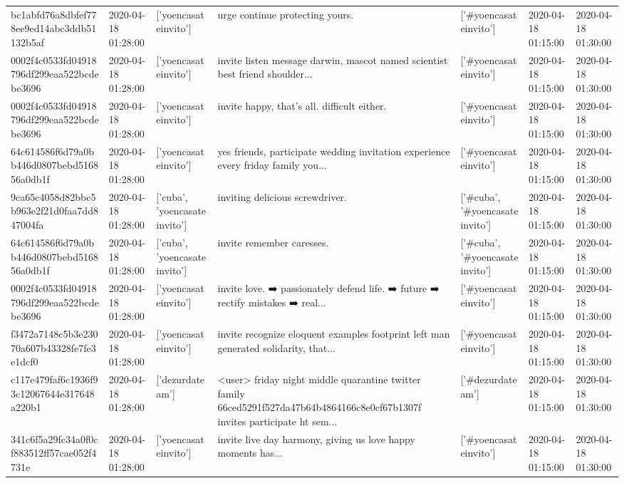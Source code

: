 \begin{tabular}{lllllll}
bc1abfd76a8dbfef778ee9ed14abc3ddb51132b5af & 2020-04-18 01:28:00 & ['yoencasateinvito'] & urge continue protecting yours. & ['#yoencasateinvito'] & 2020-04-18 01:15:00 & 2020-04-18 01:30:00 \\
0002f4c0533fd04918796df299eaa522bcdebe3696 & 2020-04-18 01:28:00 & ['yoencasateinvito'] & invite listen message darwin, mascot named scientist best friend shoulder... & ['#yoencasateinvito'] & 2020-04-18 01:15:00 & 2020-04-18 01:30:00 \\
0002f4c0533fd04918796df299eaa522bcdebe3696 & 2020-04-18 01:28:00 & ['yoencasateinvito'] & invite happy, that's all. difficult either. & ['#yoencasateinvito'] & 2020-04-18 01:15:00 & 2020-04-18 01:30:00 \\
64c614586f6d79a0bb446d0807bebd516856a0db1f & 2020-04-18 01:28:00 & ['yoencasateinvito'] & yes friends, participate wedding invitation experience every friday family you... & ['#yoencasateinvito'] & 2020-04-18 01:15:00 & 2020-04-18 01:30:00 \\
9ca65c4058d82bbc5b963e2f21d0faa7dd847004fa & 2020-04-18 01:28:00 & ['cuba', 'yoencasateinvito'] & inviting delicious screwdriver. & ['#cuba', '#yoencasateinvito'] & 2020-04-18 01:15:00 & 2020-04-18 01:30:00 \\
64c614586f6d79a0bb446d0807bebd516856a0db1f & 2020-04-18 01:28:00 & ['cuba', 'yoencasateinvito'] & invite remember caresses. & ['#cuba', '#yoencasateinvito'] & 2020-04-18 01:15:00 & 2020-04-18 01:30:00 \\
0002f4c0533fd04918796df299eaa522bcdebe3696 & 2020-04-18 01:28:00 & ['yoencasateinvito'] & invite love. ➡️ passionately defend life. ➡️ future ➡️ rectify mistakes ➡️ real... & ['#yoencasateinvito'] & 2020-04-18 01:15:00 & 2020-04-18 01:30:00 \\
f3472a7148c5b3e23070a607b43328fe7fe3e1dcf0 & 2020-04-18 01:28:00 & ['yoencasateinvito'] & invite recognize eloquent examples footprint left man generated solidarity, that... & ['#yoencasateinvito'] & 2020-04-18 01:15:00 & 2020-04-18 01:30:00 \\
c117e479faf6c1936f93c12067644e317648a220b1 & 2020-04-18 01:28:00 & ['dezurdateam'] & <user> friday night middle quarantine twitter family 66ced5291f527da47b64b4864166c8e0cf67b1307f invites participate ht sem... & ['#dezurdateam'] & 2020-04-18 01:15:00 & 2020-04-18 01:30:00 \\
341c6f5a29fc34a0f0cf883512ff57cae052f4731e & 2020-04-18 01:28:00 & ['yoencasateinvito'] & invite live day harmony, giving us love happy moments has... & ['#yoencasateinvito'] & 2020-04-18 01:15:00 & 2020-04-18 01:30:00 \\

\end{tabular}
